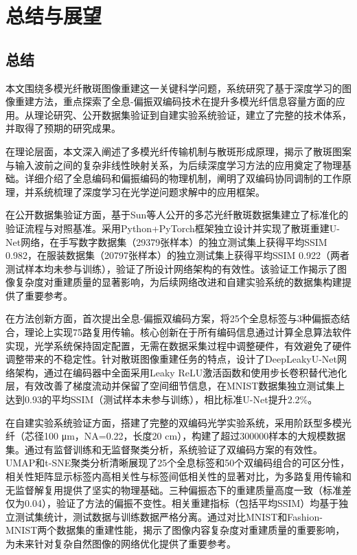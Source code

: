 
\chapter{总结与展望}\label{chap:conclusion}

{

\section{总结}

本文围绕多模光纤散斑图像重建这一关键科学问题，系统研究了基于深度学习的图像重建方法，重点探索了全息-偏振双编码技术在提升多模光纤信息容量方面的应用。从理论研究、公开数据集验证到自建实验系统验证，建立了完整的技术体系，并取得了预期的研究成果。

在理论层面，本文深入阐述了多模光纤传输机制与散斑形成原理，揭示了散斑图案与输入波前之间的复杂非线性映射关系，为后续深度学习方法的应用奠定了物理基础。详细介绍了全息编码和偏振编码的物理机制，阐明了双编码协同调制的工作原理，并系统梳理了深度学习在光学逆问题求解中的应用框架。

在公开数据集验证方面，基于Sun等人公开的多芯光纤散斑数据集建立了标准化的验证流程与对照基准。采用Python+PyTorch框架独立设计并实现了散斑重建U-Net网络，在手写数字数据集（29379张样本）的独立测试集上获得平均SSIM 0.982，在服装数据集（20797张样本）的独立测试集上获得平均SSIM 0.922（两者测试样本均未参与训练），验证了所设计网络架构的有效性。该验证工作揭示了图像复杂度对重建质量的显著影响，为后续网络改进和自建实验系统的数据集构建提供了重要参考。

在方法创新方面，首次提出全息-偏振双编码方案，将25个全息标签与3种偏振态结合，理论上实现75路复用传输。核心创新在于所有编码信息通过计算全息算法软件实现，光学系统保持固定配置，无需在数据采集过程中调整硬件，有效避免了硬件调整带来的不稳定性。针对散斑图像重建任务的特点，设计了DeepLeakyU-Net网络架构，通过在编码器中全面采用Leaky ReLU激活函数和使用步长卷积替代池化层，有效改善了梯度流动并保留了空间细节信息，在MNIST数据集独立测试集上达到0.93的平均SSIM（测试样本未参与训练），相比标准U-Net提升2.2\%。

在自建实验系统验证方面，搭建了完整的双编码光学实验系统，采用阶跃型多模光纤（芯径100 μm，NA=0.22，长度20 cm），构建了超过300000样本的大规模数据集。通过有监督训练和无监督聚类分析，系统验证了双编码方案的有效性。UMAP和t-SNE聚类分析清晰展现了25个全息标签和50个双编码组合的可区分性，相关性矩阵显示标签内高相关性与标签间低相关性的显著对比，为多路复用传输和无监督解复用提供了坚实的物理基础。三种偏振态下的重建质量高度一致（标准差仅为0.04），验证了方法的偏振不变性。相关重建指标（包括平均SSIM）均基于独立测试集统计，测试数据与训练数据严格分离。通过对比MNIST和Fashion-MNIST两个数据集的重建性能，揭示了图像内容复杂度对重建质量的重要影响，为未来针对复杂自然图像的网络优化提供了重要参考。

}
